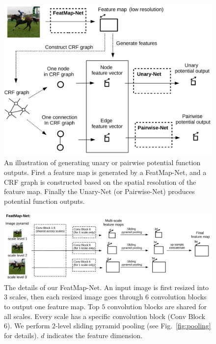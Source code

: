 \begin{figure}[t]
	\centering
	\includegraphics[width=1\linewidth]{./figs/potential_net}
\caption{An illustration of generating unary or pairwise potential function outputs.
First a feature map is generated by a FeatMap-Net, and a CRF graph is constructed based on the spatial resolution of the feature map.
Finally the Unary-Net (or Pairwise-Net) produces potential function outputs.}
\label{fig:potential_net}
\end{figure}





\begin{figure}[t]
	\center
	\includegraphics[width=.9\linewidth]{./figs/dense_cnn2}
\caption{The details of our FeatMap-Net.
An input image is first resized into $3$ scales,
then each resized image goes through 6 convolution blocks to output one feature map.
Top $5$ convolution blocks are shared for all scales. Every scale has a specific convolution block (Conv Block 6).
We perform $2$-level sliding pyramid pooling (see Fig.~\ref{fig:pooling} for details).
%
$d$ indicates the feature dimension.
}
\label{fig:featmapnet}
\end{figure}







